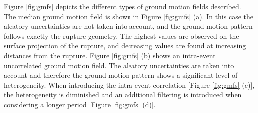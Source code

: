 Figure \ref{fig:gmfs} depicts the different types of ground motion 
fields described. The median ground motion field is shown in Figure 
\ref{fig:gmfs} (a). 
%
In this case the aleatory uncertainties are not taken into account, 
and the ground motion pattern follows exactly the rupture geometry. 
The highest values are observed on the surface projection of the rupture, and 
decreasing values are found at increasing distances from the rupture. 
%
Figure \ref{fig:gmfs} (b) shows an intra-event uncorrelated ground motion 
field. The aleatory uncertainties are taken into account and therefore the
ground motion pattern shows a significant level of heterogeneity. 
%
When introducing the intra-event correlation [Figure \ref{fig:gmfs} (c)], 
the heterogeneity is diminished and an additional filtering is introduced 
when considering a longer period [Figure \ref{fig:gmfs} (d)].
%
